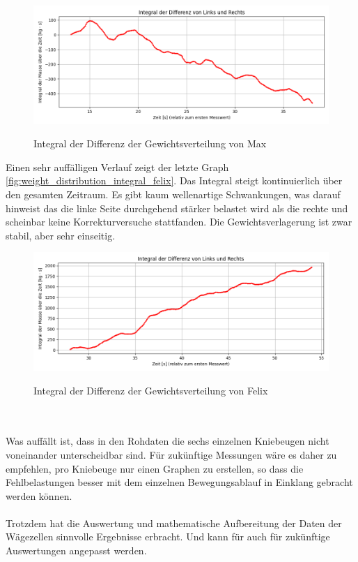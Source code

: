 \begin{figure}
  \centering
  \includegraphics[width=0.7\linewidth]{img/pyplots/Integral der Differenz - Max.png}\\
  \caption{Integral der Differenz der Gewichtsverteilung von Max}
  \label{fig:weight_distribution_integral_max}
\end{figure}
Einen sehr auffälligen Verlauf zeigt der letzte Graph \autoref{fig:weight_distribution_integral_felix}.
Das Integral steigt kontinuierlich über den gesamten Zeitraum.
Es gibt kaum wellenartige Schwankungen, was darauf hinweist das die linke Seite durchgehend stärker belastet wird als die rechte und scheinbar keine Korrekturversuche stattfanden.
Die Gewichtsverlagerung ist zwar stabil, aber sehr einseitig.
\begin{figure}
  \centering
  \includegraphics[width=0.7\linewidth]{img/pyplots/Integral der Differenz - Felix.png}\\
  \caption{Integral der Differenz der Gewichtsverteilung von Felix}
  \label{fig:weight_distribution_integral_felix}
\end{figure}
\\
\\
Was auffällt ist, dass in den Rohdaten die sechs einzelnen Kniebeugen nicht voneinander unterscheidbar sind.
Für zukünftige Messungen wäre es daher zu empfehlen, pro Kniebeuge nur einen Graphen zu erstellen, so dass die Fehlbelastungen besser mit dem einzelnen Bewegungsablauf in Einklang gebracht werden können.\\
\\
Trotzdem hat die Auswertung und mathematische Aufbereitung der Daten der Wägezellen sinnvolle Ergebnisse erbracht. Und kann für auch für zukünftige Auswertungen angepasst werden. \\
\\
